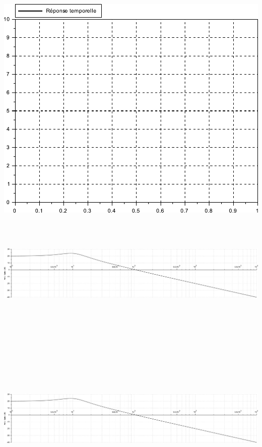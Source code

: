 \begin{center}
 \includegraphics[width=0.8\linewidth]{img/q14}
\end{center}

~\ \\ ~\ \\




\newpage


\begin{center}
 \includegraphics[width=\linewidth]{img/bode}
\end{center}

~\ \\ ~\ \\ ~\ \\ ~\ \\ ~\ \\ ~\ \\ ~\ \\ ~\ \\


\begin{center}
 \centering\includegraphics[width=\linewidth]{img/bode}
\end{center}

